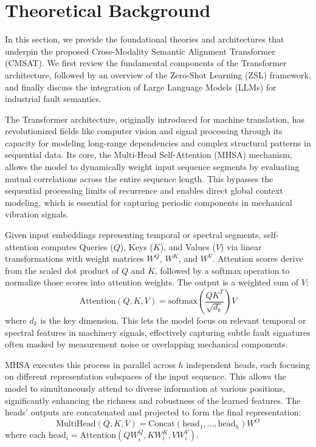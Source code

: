 \section{Theoretical Background}
In this section, we provide the foundational theories and architectures that underpin the proposed Cross-Modality Semantic Alignment Transformer (CMSAT). We first review the fundamental components of the Transformer architecture, followed by an overview of the Zero-Shot Learning (ZSL) framework, and finally discuss the integration of Large Language Models (LLMs) for industrial fault semantics.

The Transformer architecture, originally introduced for machine translation, has revolutionized fields like computer vision and signal processing through its capacity for modeling long-range dependencies and complex structural patterns in sequential data. Its core, the Multi-Head Self-Attention (MHSA) mechanism, allows the model to dynamically weight input sequence segments by evaluating mutual correlations across the entire sequence length. This bypasses the sequential processing limits of recurrence and enables direct global context modeling, which is essential for capturing periodic components in mechanical vibration signals.

Given input embeddings representing temporal or spectral segments, self-attention computes Queries ($Q$), Keys ($K$), and Values ($V$) via linear transformations with weight matrices $W^Q$, $W^K$, and $W^V$. Attention scores derive from the scaled dot product of $Q$ and $K$, followed by a softmax operation to normalize those scores into attention weights. The output is a weighted sum of $V$:
\begin{equation}
\text{Attention}(Q, K, V) = \text{softmax}\left(\frac{QK^T}{\sqrt{d_k}}\right)V
\end{equation}
where $d_k$ is the key dimension. This lets the model focus on relevant temporal or spectral features in machinery signals, effectively capturing subtle fault signatures often masked by measurement noise or overlapping mechanical components.

MHSA executes this process in parallel across $h$ independent heads, each focusing on different representation subspaces of the input sequence. This allows the model to simultaneously attend to diverse information at various positions, significantly enhancing the richness and robustness of the learned features. The heads' outputs are concatenated and projected to form the final representation:
\begin{equation}
\text{MultiHead}(Q, K, V) = \text{Concat}(\text{head}_1, \dots, \text{head}_h)W^O
\end{equation}
where each $\text{head}_i = \text{Attention}(QW_i^Q, KW_i^K, VW_i^V)$.

